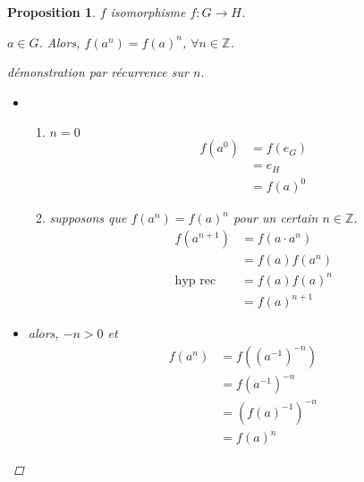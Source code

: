 \documentclass{report}
\newcommand*{\entiers}{\mathbb{Z}}
\newtheorem*{prop}{Proposition}
\theoremstyle{definition}
\theoremstyle{remark}
\begin{document}
	\begin{prop}
		$f$ isomorphisme $f:G \to H$.

		$a \in G$. Alors, $f(a^n)=f(a)^n$, $\forall n \in \entiers$.
		\begin{proof}[d\'emonstration par r\'ecurrence sur $n$]~

			\begin{itemize}
				\item[$n\geq 0$]
				\begin{enumerate}
					\item $n=0$
					\begin{align*}
						f(a^0)&= f(e_G)\\
						&= e_H\\
						&= f(a)^0
					\end{align*}
					\item supposons que $f(a^n)=f(a)^n$ pour un certain $n \in \entiers$.
					\begin{align*}
						f(a^{n+1})&= f(a \cdot a^n)\\
						&= f(a)f(a^n)\\
						\text{hyp rec}&= f(a)f(a)^n\\
						&= f(a)^{n+1}
					\end{align*}
				\end{enumerate}
				\item[$n<0$] alors, $-n>0$ et
				\begin{align*}
					f(a^n)&= f((a^{-1})^{-n})\\
					&= f(a^{-1})^{-n}\\
					&= (f(a)^{-1})^{-n}\\
					&= f(a)^n
				\end{align*}
			\end{itemize}
		\end{proof}
	\end{prop}
\end{document}
